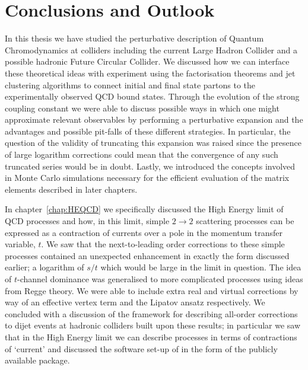 
\chapter{Conclusions and Outlook}
\label{chap:conclusion}

In this thesis we have studied the perturbative description of Quantum Chromodynamics at colliders
including the current Large Hadron Collider and a possible hadronic Future Circular Collider.  We discussed how we can
interface these theoretical ideas with experiment using the factorisation theorems and jet clustering
algorithms to connect initial and final state partons to the experimentally observed QCD bound states.
Through the evolution of the strong coupling constant we were able to discuss possible ways in which
one might approximate relevant observables by performing a perturbative expansion and the advantages
and possible pit-falls of these different strategies.  In particular, the question of the validity of
truncating this expansion was raised since the presence of large logarithm corrections could mean
that the convergence of any such truncated series would be in doubt.  Lastly, we introduced the concepts
involved in Monte Carlo simulations necessary for the efficient evaluation of the matrix elements
described in later chapters.

In chapter~\ref{chap:HEQCD} we specifically discussed the High Energy limit of QCD processes and
how, in this limit, simple $2\to2$ scattering processes can be expressed as a contraction of currents
over a pole in the momentum transfer variable, $t$.  We saw that the next-to-leading order corrections
to these simple processes contained an unexpected enhancement in exactly the form discussed earlier;
a logarithm of $s/t$ which would be large in the limit in question.  The idea of $t$-channel dominance
was generalised to more complicated processes using ideas from Regge theory.  We were able to include
extra real and virtual corrections by way of an effective vertex term and the Lipatov ansatz respectively.
We concluded with a discussion of the \hej framework for describing all-order corrections to dijet events
at hadronic colliders built upon these results; in particular we saw that in the High Energy limit we can describe processes in terms
of contractions of `current' and discussed the software set-up of \hej in the form of the publicly
available \HEJ package.

